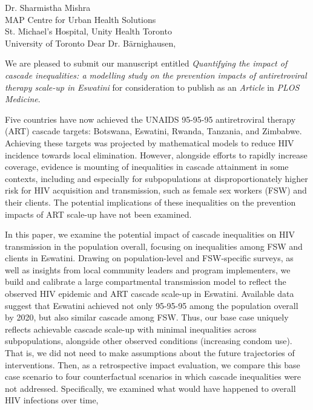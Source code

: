 \address{
  Dr. Till W. B\"{a}rnighausen\\
  Senior Editor\\
  PLOS Medicine
}{Dr. Sharmistha Mishra\\
  MAP Centre for Urban Health Solutions\\
  St. Michael's Hospital, Unity Health Toronto\\
  University of Toronto}
Dear Dr. B\"{a}rnighausen,
\par
We are pleased to submit our manuscript entitled
\emph{Quantifying the impact of cascade inequalities:
  a modelling study on the prevention impacts of antiretroviral therapy scale-up in Eswatini}
for consideration to publish as an \emph{Article} in \emph{PLOS Medicine}.
\par
Five countries have now achieved
the UNAIDS 95-95-95 antiretroviral therapy (ART) cascade targets:
Botswana, Eswatini, Rwanda, Tanzania, and Zimbabwe.
Achieving these targets was projected by
mathematical models to reduce HIV incidence towards local elimination.
However, alongside efforts to rapidly increase coverage,
evidence is mounting of inequalities in cascade attainment in some contexts,
including and especially for subpopulations
at disproportionately higher risk for HIV acquisition and transmission,
such as female sex workers (FSW) and their clients.
The potential implications of these inequalities on
the prevention impacts of ART scale-up have not been examined.
\par
In this paper, we examine the potential impact of
cascade inequalities on HIV transmission in the population overall,
focusing on inequalities among FSW and clients in Eswatini.
Drawing on population-level and FSW-specific surveys,
as well as insights from local community leaders and program implementers,
we build and calibrate a large compartmental transmission model
to reflect the observed HIV epidemic and ART cascade scale-up in Eswatini.
Available data suggest that Eswatini achieved not only
95-95-95 among the population overall by 2020, but also similar cascade among FSW.
Thus, our base case uniquely reflects achievable cascade scale-up
with minimal inequalities across subpopulations,
alongside other observed conditions (\eg increasing condom use).
That is, we did not need to make assumptions about
the future trajectories of interventions.
Then, as a retrospective impact evaluation, we compare
this base case scenario to four counterfactual scenarios in which
cascade inequalities were not addressed.
Specifically, we examined what would have happened to overall HIV infections over time,
